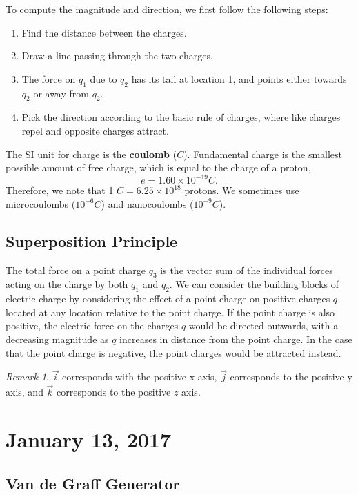 \documentclass[11pt]{article}
\theoremstyle{plain} %
\theoremstyle{definition}
\theoremstyle{example}
\theoremstyle{remark}
\newtheorem*{remark}{Remark}
\begin{document}
To compute the magnitude and direction, we first follow the following steps:
\begin{enumerate}
	\item Find the distance between the charges. 
	\item Draw a line passing through the two charges. 
	\item The force on $q_1$ due to $q_2$ has its tail at location 1, and points either towards $q_2$ or away from $q_2$. 
	\item Pick the direction according to the basic rule of charges, where like charges repel and opposite charges attract. 
\end{enumerate}

The SI unit for charge is the \textbf{coulomb} ($C$). Fundamental charge is the smallest possible amount of free charge, which is equal to the charge of a proton,
$$e = 1.60 \times 10^{-19} C.$$
Therefore, we note that 1 $C = 6.25 \times 10^{18}$ protons. We sometimes use microcoulombs ($10^{-6}C$) and nanocoulombs ($10^{-9} C$). 

\subsection{Superposition Principle}
The total force on a point charge $q_3$ is the vector sum of the individual forces acting on the charge by both $q_1$ and $q_2$. We can consider the building blocks of electric charge by considering the effect of a point charge on positive charges $q$ located at any location relative to the point charge. If the point charge is also positive, the electric force on the charges $q$ would be directed outwards, with a decreasing magnitude as $q$ increases in distance from the point charge. In the case that the point charge is negative, the point charges would be attracted instead. 
\begin{remark}
$\vec{i}$ corresponds with the positive x axis, $\vec{j}$ corresponds to the positive y axis, and $\vec{k}$ corresponds to the positive $z$ axis. 
\end{remark}

\section{January 13, 2017}
\subsection{Van de Graff Generator}
\end{document}
